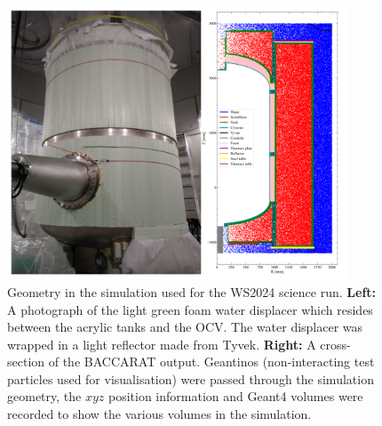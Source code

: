 \begin{figure}[ht!]
	\centering
	\includegraphics[width=0.9\textwidth]{figures/VetoEfficiency/FoamImgAndSimGeoTogether.png}
	\caption[An image of the foam displacer surrounding the OCS and final geometry in the simulation used for the WS2024 science run.]{Geometry in the simulation used for the WS2024 science run. \textbf{Left:} A photograph of the light green foam water displacer which resides between the acrylic tanks and the OCV. The water displacer was wrapped in a light reflector made from Tyvek. \textbf{Right:} A cross-section of the BACCARAT output. Geantinos (non-interacting test particles used for visualisation) were passed through the simulation geometry, the $xyz$ position information and Geant4 volumes were recorded to show the various volumes in the simulation.}
	\label{fig:VetoEff/od_geometry_for_sr3}
\end{figure}

